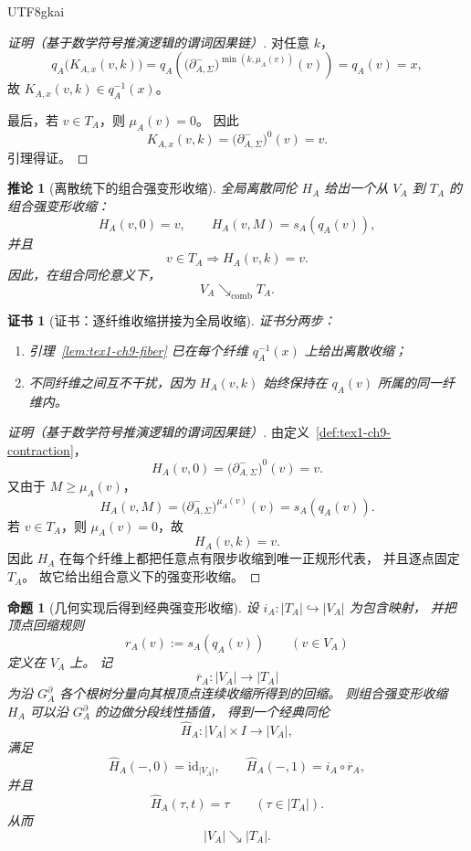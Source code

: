 \documentclass[12pt]{article}
\newtheorem{proposition}{命题}[section]
\newtheorem{corollary}{推论}[section]
\newtheorem{Certificate}{证书}[section]
\newcommand{\id}{\mathrm{id}}
\begin{document}
\begin{CJK*}{UTF8}{gkai}
\begin{proof}[证明（基于数学符号推演逻辑的谓词因果链）]
对任意 \(k\)，
\[
  q_A\bigl(K_{A,x}(v,k)\bigr)
  =
  q_A\!\left(
    \bigl(\partial^-_{A,\Sigma}\bigr)^{\min(k,\mu_A(v))}(v)
  \right)
  =
  q_A(v)
  =
  x,
\]
故 \(K_{A,x}(v,k)\in q_A^{-1}(x)\)。

最后，若 \(v\in T_A\)，则 \(\mu_A(v)=0\)。
因此
\[
  K_{A,x}(v,k)
  =
  \bigl(\partial^-_{A,\Sigma}\bigr)^0(v)
  =
  v.
\]
引理得证。
\end{proof}

\begin{corollary}[离散统下的组合强变形收缩]
\label{cor:tex1-ch9-comb}
全局离散同伦 \(H_A\) 给出一个从 \(V_A\) 到 \(T_A\) 的组合强变形收缩：
\[
  H_A(v,0)=v,
  \qquad
  H_A(v,M)=s_A(q_A(v)),
\]
并且
\[
  v\in T_A
  \Rightarrow
  H_A(v,k)=v.
\]
因此，在组合同伦意义下，
\[
  \boxed{
    V_A \searrow_{\mathrm{comb}} T_A.
  }
\]
\end{corollary}

\begin{Certificate}[证书：逐纤维收缩拼接为全局收缩]
\label{cert:tex1-ch9-comb}
证书分两步：
\begin{enumerate}
  \item 引理~\ref{lem:tex1-ch9-fiber} 已在每个纤维 \(q_A^{-1}(x)\) 上给出离散收缩；
  \item 不同纤维之间互不干扰，因为 \(H_A(v,k)\) 始终保持在 \(q_A(v)\) 所属的同一纤维内。
\end{enumerate}
\end{Certificate}

\begin{proof}[证明（基于数学符号推演逻辑的谓词因果链）]
由定义~\ref{def:tex1-ch9-contraction}，
\[
  H_A(v,0)
  =
  \bigl(\partial^-_{A,\Sigma}\bigr)^0(v)
  =
  v.
\]
又由于 \(M\ge \mu_A(v)\)，
\[
  H_A(v,M)
  =
  \bigl(\partial^-_{A,\Sigma}\bigr)^{\mu_A(v)}(v)
  =
  s_A(q_A(v)).
\]
若 \(v\in T_A\)，则 \(\mu_A(v)=0\)，故
\[
  H_A(v,k)=v.
\]
因此 \(H_A\) 在每个纤维上都把任意点有限步收缩到唯一正规形代表，
并且逐点固定 \(T_A\)。
故它给出组合意义下的强变形收缩。
\end{proof}

\begin{proposition}[几何实现后得到经典强变形收缩]
\label{prop:tex1-ch9-realization}
设 \(i_A:|T_A|\hookrightarrow |V_A|\) 为包含映射，
并把顶点回缩规则
\[
  r_A(v):=s_A(q_A(v))
  \qquad
  (v\in V_A)
\]
定义在 \(V_A\) 上。
记
\[
  \overline r_A:|V_A|\to |T_A|
\]
为沿 \(G_A^\partial\) 各个根树分量向其根顶点连续收缩所得到的回缩。
则组合强变形收缩 \(H_A\) 可以沿 \(G_A^\partial\) 的边做分段线性插值，
得到一个经典同伦
\[
  \widehat H_A:|V_A|\times I\to |V_A|,
\]
满足
\[
  \widehat H_A(-,0)=\id_{|V_A|},
  \qquad
  \widehat H_A(-,1)=i_A\circ \overline r_A,
\]
并且
\[
  \widehat H_A(\tau,t)=\tau
  \qquad
  (\tau\in |T_A|).
\]
从而
\[
  \boxed{
    |V_A| \searrow |T_A|.
  }
\]
\end{proposition}


\end{CJK*}
\end{document}
